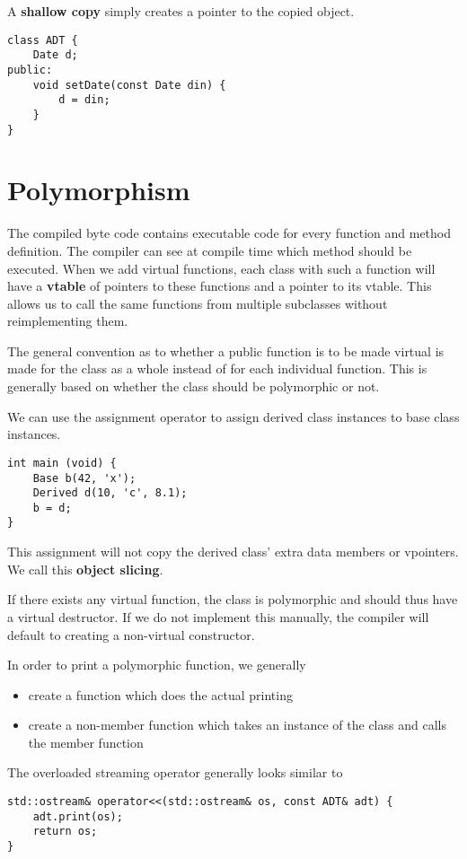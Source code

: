 \documentclass[12pt]{article}
\begin{document}
A {\bf shallow copy} simply creates a pointer to the copied object.
\begin{verbatim}
class ADT {
    Date d;
public:
    void setDate(const Date din) {
        d = din;
    }
}
\end{verbatim}

\section{Polymorphism}
The compiled byte code contains executable code for every function and method definition. The compiler can see at compile time which method should be executed. When we add virtual functions, each class with such a function will have a {\bf vtable} of pointers to these functions and a pointer to its vtable. This allows us to call the same functions from multiple subclasses without reimplementing them.

The general convention as to whether a public function is to be made virtual is made for the class as a whole instead of for each individual function. This is generally based on whether the class should be polymorphic or not.

We can use the assignment operator to assign derived class instances to base class instances.
\begin{verbatim}
int main (void) {
    Base b(42, 'x');
    Derived d(10, 'c', 8.1);
    b = d;
}
\end{verbatim}
This assignment will not copy the derived class' extra data members or vpointers. We call this {\bf object slicing}.

If there exists any virtual function, the class is polymorphic and should thus have a virtual destructor. If we do not implement this manually, the compiler will default to creating a non-virtual constructor.

In order to print a polymorphic function, we generally
\begin{itemize}
\item create a  function which does the actual printing
\item create a non-member function  which takes an instance of the class and calls the  member function
\end{itemize}

The overloaded streaming operator generally looks similar to
\begin{verbatim}
std::ostream& operator<<(std::ostream& os, const ADT& adt) {
    adt.print(os);
    return os;
}
\end{verbatim}
\end{document}
